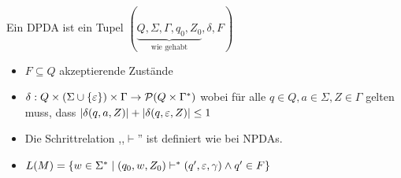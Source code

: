 
\begin{Def}[name={[DPDA]}]
	Ein \ac{DPDA} ist ein Tupel $(\underbrace{Q,\Sigma,\Gamma,q_0,Z_0}_{\text{wie gehabt}},\delta,F)$
	\vspace{-1em}
	\begin{itemize}
	\item $F\subseteq Q$ akzeptierende Zustände
	\item $\delta: Q\x (\Sigma\cup\{\Eps\})\x \Gamma \-> \mathcal{P}(Q\x \Gamma^*)$ wobei für alle $q\in Q,a\in\Sigma,Z\in\Gamma$ gelten muss, dass
	$|\delta(q,a,Z)| + |\delta(q,\varepsilon,Z)| \leq 1$
	\item Die Schrittrelation ,,$\vdash$'' ist definiert wie bei NPDAs.
	\item $L(M) = \{w\in\Sigma^* \mid (q_0,w,Z_0) \vdash^* (q',\varepsilon,\gamma) \land q'\in F \}$ \qedhere
	\end{itemize}
\end{Def}

